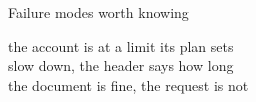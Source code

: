 \begin{frame}{Failure modes worth knowing}
  \begin{console}
   the account is at a limit its plan sets\\
   slow down, the header says how long\\
   the document is fine, the request is not
  \end{console}
\end{frame}
